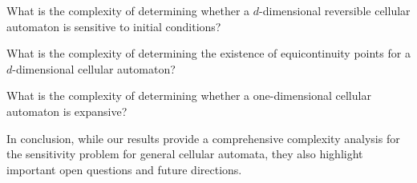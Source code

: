 \documentclass{llncs}
\begin{document}
\begin{question} What is the complexity of determining whether a $d$-dimensional reversible cellular automaton is sensitive to initial conditions? \end{question}

\begin{question} What is the complexity of determining the existence of equicontinuity points for a $d$-dimensional cellular automaton? \end{question}

\begin{question} What is the complexity of determining whether a one-dimensional cellular automaton is expansive? \end{question}

In conclusion, while our results provide a comprehensive complexity analysis for the sensitivity problem for general cellular automata, they also highlight important open questions and future directions.



  
\end{document}
